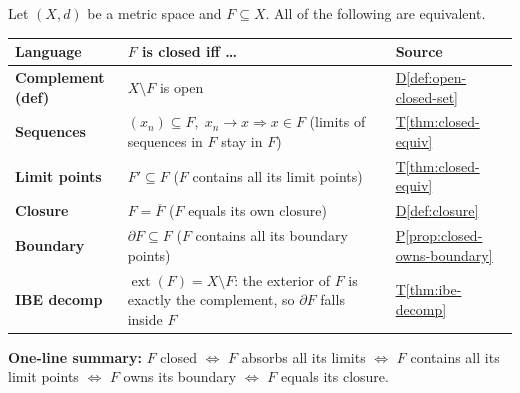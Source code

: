 \bigskip


\begin{tcolorbox}[colback=gray!6, colframe=gray!40, arc=2pt,
  left=8pt, right=8pt, top=6pt, bottom=6pt,
  title={\small\textbf{Part III \enspace Closed Sets — Every Characterisation}},
  fonttitle=\small\bfseries]
\small
Let $(X,d)$ be a metric space and $F \subseteq X$.
All of the following are equivalent.
\renewcommand{\arraystretch}{1.55}
\begin{tabular}{p{2.0cm} p{6.4cm} p{3.8cm}}
\toprule
\textbf{Language} & \textbf{$F$ is closed iff \ldots} & \textbf{Source} \\
\midrule

\textbf{Complement (def)}
  & $X \setminus F$ is open
  & \hyperref[def:open-closed-set]{D\ref*{def:open-closed-set}} \\[2pt]

\textbf{Sequences}
  & $(x_n) \subseteq F,\; x_n \to x \Rightarrow x \in F$
    \newline (limits of sequences in $F$ stay in $F$)
  & \hyperref[thm:closed-equiv]{T\ref*{thm:closed-equiv}} \\[2pt]

\textbf{Limit points}
  & $F' \subseteq F$
    \newline ($F$ contains all its limit points)
  & \hyperref[thm:closed-equiv]{T\ref*{thm:closed-equiv}} \\[2pt]

\textbf{Closure}
  & $F = \overline{F}$
    \newline ($F$ equals its own closure)
  & \hyperref[def:closure]{D\ref*{def:closure}} \\[2pt]

\textbf{Boundary}
  & $\partial F \subseteq F$
    \newline ($F$ contains all its boundary points)
  & \hyperref[prop:closed-owns-boundary]{P\ref*{prop:closed-owns-boundary}} \\[2pt]

\textbf{IBE decomp}
  & $\operatorname{ext}(F) = X \setminus F$:
    the exterior of $F$ is exactly the complement,
    so $\partial F$ falls inside $F$
  & \hyperref[thm:ibe-decomp]{T\ref*{thm:ibe-decomp}} \\[2pt]

\bottomrule
\end{tabular}

\medskip
\noindent\textbf{One-line summary:} \;
$F$ closed $\iff$ $F$ absorbs all its limits $\iff$
$F$ contains all its limit points $\iff$
$F$ owns its boundary $\iff$ $F$ equals its closure.
\end{tcolorbox}

